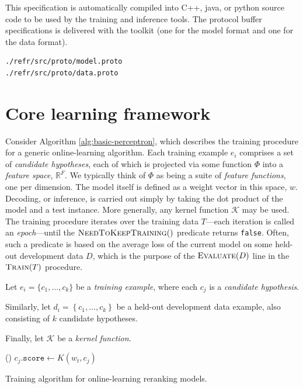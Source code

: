 \documentclass[a4paper]{article}
\begin{document}
This specification is automatically compiled into C++, java, or python source code to be
used by the training and inference tools.  The protocol buffer specifications is
delivered with the toolkit (one for the model format and one for the data
format).
\begin{verbatim}
./refr/src/proto/model.proto
./refr/src/proto/data.proto
\end{verbatim}


\section{Core learning framework}

Consider Algorithm \ref{alg:basic-perceptron}, which describes the
training procedure for a generic online-learning algorithm. Each
training example $e_{i}$ comprises a set of \emph{candidate hypotheses},
each of which is projected via some function $\Phi$ into a \emph{feature
space}, $\mathbb{R}^{F}$. We typically think of $\Phi$ as being
a suite of \emph{feature functions}, one per dimension.\emph{ }The\emph{
}model itself is defined as a weight vector in this space, $w$. Decoding,
or inference, is carried out simply by taking the dot product of the
model and a test instance. More generally, any kernel function $\mathcal{K}$
may be used. The training procedure iterates over the training data
$T$---each iteration is called an \emph{epoch}---until the $\Call{NeedToKeepTraining}{}()$
predicate returns \texttt{false}. Often, such a predicate is based
on the average loss of the current model on some held-out development
data $D$, which is the purpose of the $\Call{Evaluate}{D}$ line
in the $\Call{Train}{T}$ procedure.

\begin{algorithm}
Let $e_{i}=\{c_{1},\ldots,c_{k}\}$ be a \emph{training example},
where each $c_{j}$ is a \emph{candidate hypothesis}.

Similarly, let $d_{i}=\left\{ c_{1},\ldots,c_{k}\right\} $ be a held-out
development data example, also consisting of $k$ candidate hypotheses.

Finally, let $\mathcal{K}$ be a \emph{kernel function}.

\renewcommand\algorithmicforall{\textbf{foreach}}
\begin{algorithmic}
\scriptsize
{}
    \State {}
    \State {}
  \EndWhile
\EndProcedure
\State
{}
    \State {}
      \State {}()
    \EndIf
  \EndFor
\EndProcedure
\State
{}
    \State $c_j.\texttt{score} \leftarrow K(w_t, c_j)$
  \EndFor
\EndProcedure
\normalsize
\end{algorithmic}

\caption{\label{alg:basic-perceptron}Training algorithm for online-learning
reranking models.}
\end{algorithm}
\end{document}
